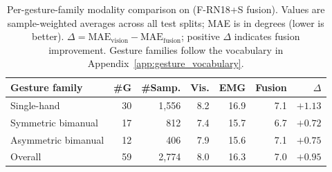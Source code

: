 \begin{table}[h]
\centering
\caption{Per-gesture-family modality comparison on \dataset{} (F-RN18+S fusion). Values are sample-weighted averages across all test splits; MAE is in degrees (lower is better). $\Delta = \text{MAE}_\text{vision} - \text{MAE}_\text{fusion}$; positive $\Delta$ indicates fusion improvement. Gesture families follow the vocabulary in Appendix~\ref{app:gesture_vocabulary}.}
\label{tab:per_gesture_family}
\footnotesize
\setlength{\tabcolsep}{3.8pt}
\renewcommand{\arraystretch}{1.08}
\begin{tabular}{lrrrrrr}
\toprule
Gesture family & \#G & \#Samp. & Vis. & EMG & Fusion & $\Delta$ \\
\midrule
Single-hand & 30 & 1,556 & 8.2 & 16.9 & 7.1 & $\mathbf{+1.13}$ \\
Symmetric bimanual & 17 & 812 & 7.4 & 15.7 & 6.7 & $+0.72$ \\
Asymmetric bimanual & 12 & 406 & 7.9 & 15.6 & 7.1 & $+0.75$ \\
\midrule
Overall & 59 & 2,774 & 8.0 & 16.3 & 7.0 & $+0.95$ \\
\bottomrule
\end{tabular}
\end{table}